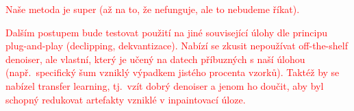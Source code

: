 \documentclass[conference]{IEEEtran}
\newcommand{\todo}[1]{\textcolor{red}{#1}}
\begin{document}
\todo{Naše metoda je super (až na to, že nefunguje, ale to nebudeme říkat).}

\todo{Dalším postupem bude testovat použití na jiné související úlohy dle principu plug-and-play (declipping, dekvantizace). Nabízí se zkusit nepoužívat off-the-shelf denoiser, ale vlastní, který je učený na datech příbuzných s naší úlohou (např.\ specifický šum vzniklý výpadkem jistého procenta vzorků). Taktéž by se nabízel transfer learning, tj.\ vzít dobrý denoiser a jenom ho doučit, aby byl schopný redukovat artefakty vzniklé v inpaintovací úloze.}

%



\end{document}

